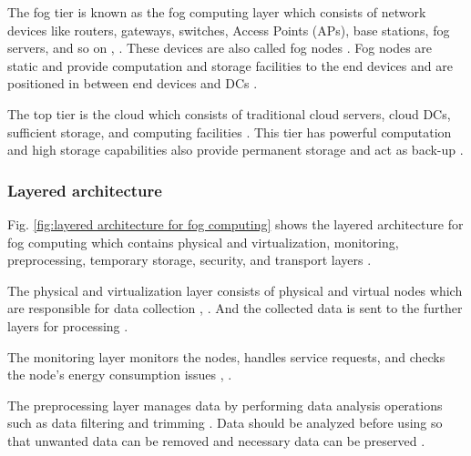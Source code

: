 The fog tier is known as the fog computing layer which consists of network devices like routers, gateways, switches, Access Points (APs), base stations, fog servers, and so on \cite{mukherjee2018survey}, \cite{webpage}. These devices are also called fog nodes \cite{mukherjee2018survey}. Fog nodes are static \cite{webpage} and provide computation and storage facilities to the end devices \cite{mukherjee2018survey} and are positioned in between end devices and DCs \cite{webpage}. \par

The top tier is the cloud which consists of traditional cloud servers, cloud DCs, sufficient storage, and computing facilities \cite{mukherjee2018survey}. This tier has powerful computation and high storage capabilities also provide permanent storage and act as back-up \cite{webpage}. 


\subsubsection{Layered architecture}

Fig. \ref{fig:layered architecture for fog computing} shows the layered architecture for fog computing which contains physical and virtualization, monitoring, preprocessing, temporary storage, security, and transport layers \cite{mukherjee2018survey}.

The physical and virtualization layer consists of physical and virtual nodes which are responsible for data collection \cite{mukherjee2018survey}, \cite{webpage}. And the collected data is sent to the further layers for processing \cite{webpage}.\par

The monitoring layer monitors the nodes, handles service requests, and checks the node's energy consumption issues \cite{mukherjee2018survey}, \cite{webpage}. \par

The preprocessing layer manages data by performing data analysis operations \cite{webpage} such as data filtering and trimming \cite{mukherjee2018survey}. Data should be analyzed before using so that unwanted data can be removed and necessary data can be preserved \cite{webpage}. \par

